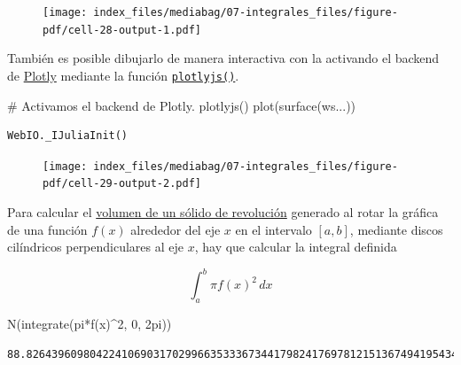 \documentclass[
  a4paper,
]{scrreport}
\newenvironment{Shaded}{\begin{snugshade}}{\end{snugshade}}
\newcommand{\CommentTok}[1]{\textcolor[rgb]{0.37,0.37,0.37}{#1}}
\newcommand{\FloatTok}[1]{\textcolor[rgb]{0.68,0.00,0.00}{#1}}
\newcommand{\FunctionTok}[1]{\textcolor[rgb]{0.28,0.35,0.67}{#1}}
\newcommand{\NormalTok}[1]{\textcolor[rgb]{0.00,0.23,0.31}{#1}}
\newcommand{\OperatorTok}[1]{\textcolor[rgb]{0.37,0.37,0.37}{#1}}
\theoremstyle{definition}
\theoremstyle{remark}
\begin{document}
\begin{tcolorbox}
\begin{figure}[H]

{\centering \texttt{[image: index\_files/mediabag/07-integrales\_files/figure-pdf/cell-28-output-1.pdf]}

}

\end{figure}

También es posible dibujarlo de manera interactiva con la activando el
backend de \href{https://plotly.com/julia/}{Plotly} mediante la función
\href{https://docs.juliaplots.org/latest/gallery/plotlyjs/}{\texttt{plotlyjs()}}.

\begin{Shaded}
\begin{Highlighting}[]
\CommentTok{\# Activamos el backend de Plotly.}
\FunctionTok{plotlyjs}\NormalTok{()}
\FunctionTok{plot}\NormalTok{(}\FunctionTok{surface}\NormalTok{(ws}\OperatorTok{...}\NormalTok{))}
\end{Highlighting}
\end{Shaded}

\begin{verbatim}
WebIO._IJuliaInit()
\end{verbatim}

\begin{figure}[H]

{\centering \texttt{[image: index\_files/mediabag/07-integrales\_files/figure-pdf/cell-29-output-2.pdf]}

}

\end{figure}

Para calcular el
\href{https://aprendeconalf.es/analisis-manual/09-integrales.html\#c\%C3\%A1lculo-de-vol\%C3\%BAmenes-de-s\%C3\%B3lidos-de-revoluci\%C3\%B3n}{volumen
de un sólido de revolución} generado al rotar la gráfica de una función
\(f(x)\) alrededor del eje \(x\) en el intervalo \([a,b]\), mediante
discos cilíndricos perpendiculares al eje \(x\), hay que calcular la
integral definida

\[
\int_a^b \pi f(x)^2\, dx
\]

\begin{Shaded}
\begin{Highlighting}[]
\FunctionTok{N}\NormalTok{(}\FunctionTok{integrate}\NormalTok{(}\FunctionTok{pi*f}\NormalTok{(x)}\OperatorTok{\^{}}\FloatTok{2}\NormalTok{, }\FloatTok{0}\NormalTok{, }\FloatTok{2}\NormalTok{pi))}
\end{Highlighting}
\end{Shaded}

\begin{verbatim}
88.82643960980422410690317029966353336734417982417697812151367494195434357891355
\end{verbatim}

\end{tcolorbox}
\end{document}
